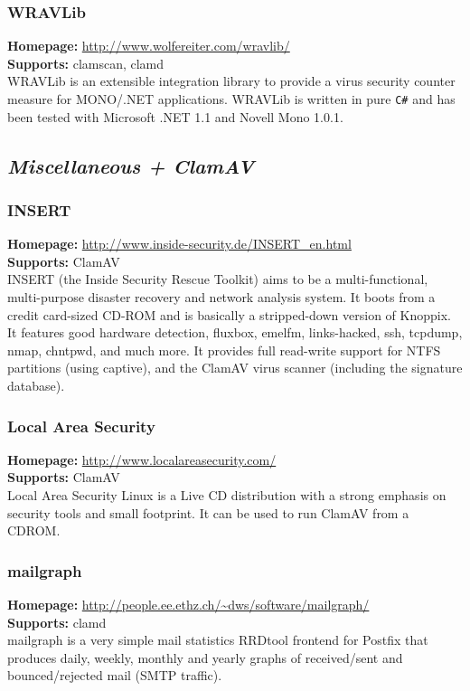 \documentclass[a4paper,titlepage,12pt]{article}
\begin{document}
    \subsubsection{WRAVLib}
    \textbf{Homepage:} \url{http://www.wolfereiter.com/wravlib/}\\
    \textbf{Supports:} clamscan, clamd\\[4pt]
    WRAVLib is an extensible integration library to provide a virus security
    counter measure for MONO/.NET applications. WRAVLib is written in pure
    \verb+C#+ and has been tested with Microsoft .NET 1.1 and Novell Mono 1.0.1.

    \subsection{\emph{Miscellaneous + ClamAV}}

    \subsubsection{INSERT}
    \textbf{Homepage:} \url{http://www.inside-security.de/INSERT_en.html}\\
    \textbf{Supports:} ClamAV\\[4pt]
    INSERT (the Inside Security Rescue Toolkit) aims to be a multi-functional,
    multi-purpose disaster recovery and network analysis system. It boots from
    a credit card-sized CD-ROM and is basically a stripped-down version of
    Knoppix. It features good hardware detection, fluxbox, emelfm,
    links-hacked, ssh, tcpdump, nmap, chntpwd, and much more. It provides full
    read-write support for NTFS partitions (using captive), and the ClamAV
    virus scanner (including the signature database). 

    \subsubsection{Local Area Security}
    \textbf{Homepage:} \url{http://www.localareasecurity.com/}\\
    \textbf{Supports:} ClamAV\\[4pt]
    Local Area Security Linux is a Live CD distribution with a strong
    emphasis on security tools and small footprint. It can be used to run
    ClamAV from a CDROM. 

    \subsubsection{mailgraph}
    \textbf{Homepage:} \url{http://people.ee.ethz.ch/~dws/software/mailgraph/}\\
    \textbf{Supports:} clamd\\[4pt]
    mailgraph is a very simple mail statistics RRDtool frontend for Postfix
    that produces daily, weekly, monthly and yearly graphs of received/sent
    and bounced/rejected mail (SMTP traffic).
\end{document}
